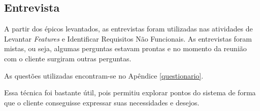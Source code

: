 \subsection{Entrevista}

A partir dos épicos levantados, as entrevistas foram utilizadas nas atividades de Levantar \textit{Features} e Identificar Requisitos Não Funcionais.
As entrevistas foram mistas, ou seja, algumas perguntas estavam prontas e no momento da reunião com o cliente surgiram
outras perguntas.

As questões utilizadas encontram-se no Apêndice \ref{questionario}.

Essa técnica foi bastante útil, pois permitiu explorar pontos do sistema de forma que o cliente conseguisse
expressar suas necessidades e desejos. 

% 
% 
% 
% 
